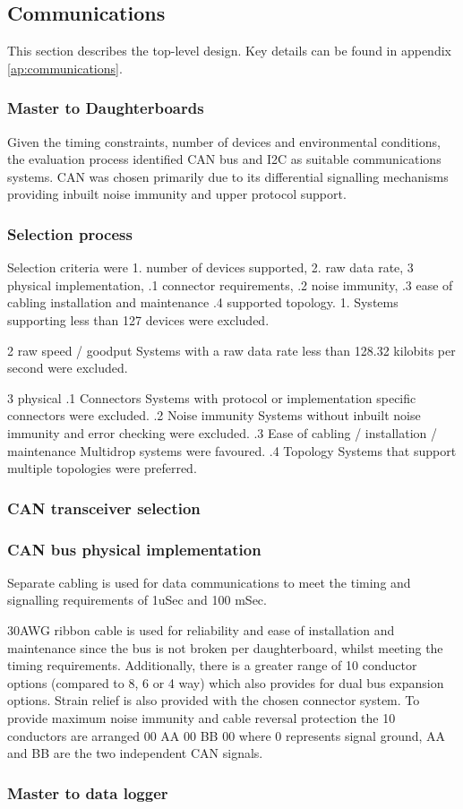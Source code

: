 \subsection{Communications}
This section describes the top-level design. Key details can be found in appendix \ref{ap:communications}.

\subsubsection{Master to Daughterboards} 
Given the timing constraints, number of devices and environmental conditions, the evaluation process identified CAN bus and I2C as suitable communications systems.
CAN was chosen primarily due to its differential signalling mechanisms providing inbuilt noise immunity and upper protocol support. 

\subsubsection{Selection process}
Selection criteria were 1. number of devices supported, 2. raw data rate, 3 physical implementation, .1 connector requirements, .2 noise immunity, .3 ease of cabling installation and maintenance .4 supported topology. 
1. Systems supporting less than 127 devices were excluded.

2 raw speed / goodput
Systems with a raw data rate less than 128.32 kilobits per second were excluded.

3 physical
.1 Connectors
Systems with protocol or implementation specific connectors were excluded.
.2 Noise immunity 
Systems without inbuilt noise immunity and error checking were excluded.
.3 Ease of cabling / installation / maintenance 
Multidrop systems were favoured.
.4 Topology 
Systems that support multiple topologies were preferred.

\subsubsection{CAN transceiver selection}


\subsubsection{CAN bus physical implementation }
Separate cabling is used for data communications to meet the timing and signalling requirements of 1uSec and 100 mSec.

30AWG ribbon cable is used for reliability and ease of installation and maintenance since the bus is not broken per daughterboard, whilst meeting the timing requirements. Additionally, there is a greater range of 10 conductor options (compared to 8, 6 or 4 way) which also provides for dual bus expansion options. Strain relief is also provided with the chosen connector system. To provide maximum noise immunity and cable reversal protection the 10 conductors are arranged 00 AA 00 BB 00 where 0 represents signal ground, AA and BB are the two independent CAN signals. 


\subsubsection{Master to data logger}
